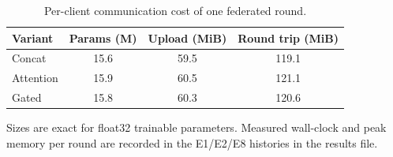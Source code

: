 \begin{table}[t]
\caption{Per-client communication cost of one federated round.}
\label{tab:cost}
\centering\footnotesize
\setlength\tabcolsep{5pt}
\begin{tabular}{lccc}
\toprule
\textbf{Variant} & Params (M) & Upload (MiB) & Round trip (MiB)\\
\midrule
Concat & 15.6 & 59.5 & 119.1 \\
Attention & 15.9 & 60.5 & 121.1 \\
Gated & 15.8 & 60.3 & 120.6 \\
\bottomrule
\end{tabular}
\vspace{1pt}

{\scriptsize Sizes are exact for float32 trainable parameters. Measured wall-clock and peak memory per round are recorded in the E1/E2/E8 histories in the results file.}
\end{table}
